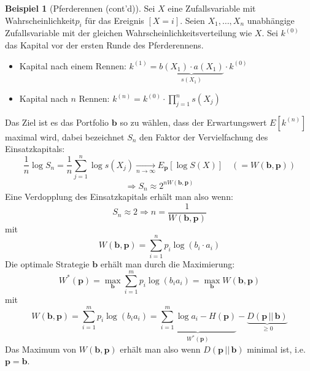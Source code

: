 \documentclass[a4paper]{scrartcl}
\theoremstyle{plain}
\theoremstyle{definition}
\theoremstyle{examplestyle}
\newtheorem{example}{Beispiel}[section]
\newcommand\WK{Wahrscheinlichkeit\xspace}
\newcommand\WV{Wahrscheinlichkeitsverteilung\xspace}
\newcommand\ZV{Zufallsvariable\xspace}
\begin{document}
\begin{example}[Pferderennen (cont'd)]
  Sei $X$ eine \ZV mit \WK $p_i$ f\"ur das Ereignis $\left[ X = i \right]$.
  Seien $X_1,\dots,X_n$ unabh\"angige \ZV mit der gleichen \WV wie $X$. Sei $k^{\left( 0 \right)}$ das Kapital vor der ersten Runde des Pferderennens.
  \begin{itemize}
	\item Kapital nach einem Rennen: $k^{\left( 1 \right)} = \underbrace{b\left( X_1 \right) \cdot a\left( X_1 \right)}_{s\left( X_1 \right)}\cdot{k^{\left( 0 \right)}}$
	\item Kapital nach $n$ Rennen: $k^{\left( n \right)} = k^{\left( 0 \right)} \cdot \displaystyle{\prod_{j=1}^n} s\left( X_j \right) $
  \end{itemize}
  Das Ziel ist es das Portfolio $\mathbf b$ so zu w\"ahlen, dass der Erwartungswert $E\left[ k^{\left( n \right)} \right]$ maximal wird, dabei bezeichnet $S_n$ den Faktor der
  Vervielfachung des Einsatzkapitals:
  \[ \frac{1}{n} \log S_n = \frac{1}{n}\sum_{j=1}^n\log s\left( X_j \right) \underset{n \rightarrow \infty}\rightarrow
		E_\mathbf{p}\left[ \log S\left( X \right) \right] \quad \left( = W\left( \mathbf b, \mathbf p \right) \right)\]
	\[ \Rightarrow S_n \approx 2^{n W\left( \mathbf b, \mathbf p \right)} \]
	Eine Verdopplung des Einsatzkapitals erh\"alt man also wenn:
	\[ S_n \approx 2 \Rightarrow n = \frac{1}{W\left( \mathbf b, \mathbf p \right)} \]
	mit
	\[ W\left( \mathbf b, \mathbf p \right) = \sum_{i=1}^n p_i\log\left( b_i\cdot a_i \right) \]
	Die optimale Strategie $\mathbf b$ erh\"alt man durch die Maximierung:
	\[ W^\ast \left( \mathbf p \right) = \max_{\mathbf b} \sum_{i=1}^m p_i \log \left( b_i a_i \right) = \max_{\mathbf b} W\left( \mathbf b, \mathbf p \right) \]
	mit
	\[ W\left( \mathbf b, \mathbf p \right) = \sum_{i=1}^m p_i \log\left( b_ia_i \right) = \underbrace{\sum_{i=1}^m\log a_i - H\left( \mathbf p \right)}_{W^\ast\left( \mathbf p \right)}
	- \underbrace{D\left( \mathbf p\, ||\, \mathbf b \right)}_{\geq 0} \]
	Das Maximum von $W\left( \mathbf b,\mathbf p \right)$ erhält man also wenn $D\left( \mathbf p\, ||\, \mathbf b \right)$ minimal ist, i.e.\@ $\mathbf p = \mathbf b$.
\end{example}
\end{document}
